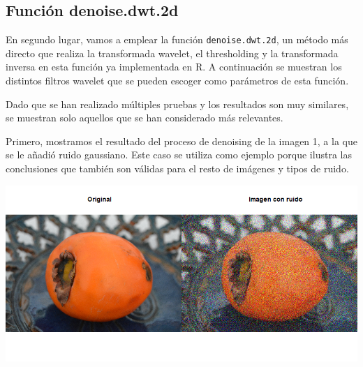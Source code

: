 \documentclass[
]{article}
\begin{document}
\subsection{Función denoise.dwt.2d}\label{funciuxf3n-denoise.dwt.2d}

En segundo lugar, vamos a emplear la función \texttt{denoise.dwt.2d}, un
método más directo que realiza la transformada wavelet, el thresholding
y la transformada inversa en esta función ya implementada en R. A
continuación se muestran los distintos filtros wavelet que se pueden
escoger como parámetros de esta función.

Dado que se han realizado múltiples pruebas y los resultados son muy
similares, se muestran solo aquellos que se han considerado más
relevantes.

Primero, mostramos el resultado del proceso de denoising de la imagen 1,
a la que se le añadió ruido gaussiano. Este caso se utiliza como ejemplo
porque ilustra las conclusiones que también son válidas para el resto de
imágenes y tipos de ruido.

\begin{center}\includegraphics[width=0.4\linewidth,height=0.4\textheight]{denoisedwt2d/gaussian} \end{center}
\end{document}
